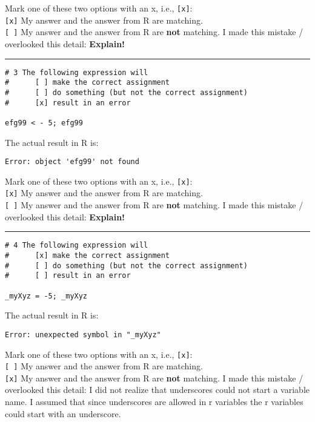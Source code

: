 \documentclass[12pt,letterpaper,final]{article}\usepackage[]{graphicx}\usepackage[]{xcolor}
\begin{document}
\begin{enumerate}
Mark one of these two options with an x, i.e., \verb|[x]|: \\
\verb|[x]| My answer and the answer from R are matching. \\
\verb|[ ]| My answer and the answer from R are {\bf not} matching. 
I made this mistake / overlooked this detail: {\bf Explain!} \\


\hrule


\begin{verbatim}
# 3 The following expression will
#      [ ] make the correct assignment
#      [ ] do something (but not the correct assignment)
#      [x] result in an error

efg99 < - 5; efg99
\end{verbatim}

The actual result in R is: 
\begin{verbatim}
Error: object 'efg99' not found
\end{verbatim}


Mark one of these two options with an x, i.e., \verb|[x]|: \\
\verb|[x]| My answer and the answer from R are matching. \\
\verb|[ ]| My answer and the answer from R are {\bf not} matching. 
I made this mistake / overlooked this detail: {\bf Explain!} \\


\hrule


\begin{verbatim}
# 4 The following expression will
#      [x] make the correct assignment
#      [ ] do something (but not the correct assignment)
#      [ ] result in an error

_myXyz = -5; _myXyz
\end{verbatim}

The actual result in R is: 
\begin{verbatim}
Error: unexpected symbol in "_myXyz"
\end{verbatim}


Mark one of these two options with an x, i.e., \verb|[x]|: \\
\verb|[ ]| My answer and the answer from R are matching. \\
\verb|[x]| My answer and the answer from R are {\bf not} matching. 
I made this mistake / overlooked this detail: I did not realize that underscores could not start a variable name. I assumed
that since underscores are allowed in r variables the r variables could start with an underscore.\\



\end{enumerate}
\end{document}
